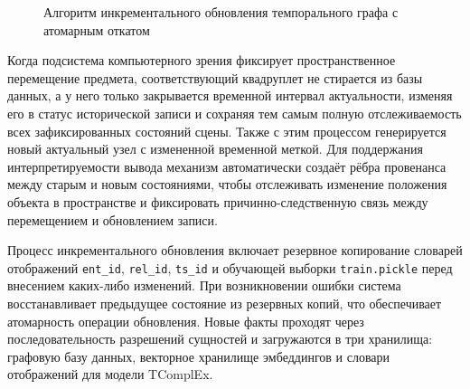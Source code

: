 \begin{figure}[htbp]

\caption{Алгоритм инкрементального обновления темпорального графа с атомарным откатом}
\label{fig:incremental}
\end{figure}

Когда подсистема компьютерного зрения фиксирует пространственное перемещение предмета, соответствующий квадруплет не стирается из базы данных, а у него только закрывается временной интервал актуальности, изменяя его в статус исторической записи и сохраняя тем самым полную отслеживаемость всех зафиксированных состояний сцены. Также с этим процессом генерируется новый актуальный узел с измененной временной меткой. Для поддержания интерпретируемости вывода механизм автоматически создаёт рёбра провенанса между старым и новым состояниями, чтобы отслеживать изменение положения объекта в пространстве и фиксировать причинно-следственную связь между перемещением и обновлением записи.

Процесс инкрементального обновления включает резервное копирование словарей отображений \texttt{ent\_id}, \texttt{rel\_id}, \texttt{ts\_id} и обучающей выборки \texttt{train.pickle} перед внесением каких-либо изменений. При возникновении ошибки система восстанавливает предыдущее состояние из резервных копий, что обеспечивает атомарность операции обновления. Новые факты проходят через последовательность разрешений сущностей и загружаются в три хранилища: графовую базу данных, векторное хранилище эмбеддингов и словари отображений для модели TComplEx.


